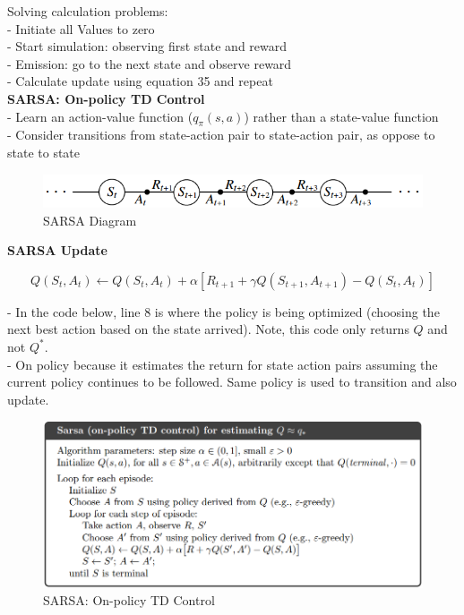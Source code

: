 \documentclass{article}
\begin{document}
\noindent
Solving calculation problems:\\
- Initiate all Values to zero\\
- Start simulation: observing first state and reward\\
- Emission: go to the next state and observe reward\\
- Calculate update using equation 35 and repeat\\

\noindent
\textbf{SARSA: On-policy TD Control}\\
- Learn an action-value function ($q_{\pi}(s, a)$) rather than a state-value function\\
- Consider transitions from state-action pair to state-action pair, as oppose to
state to state\\

\begin{figure}[h]
\includegraphics[scale=0.5]{sarsa_diagram}
\centering
\caption{SARSA Diagram}
\end{figure}

\newpage
\noindent
\textbf{SARSA Update}

\begin{equation}
Q\left(S_{t}, A_{t}\right) \leftarrow Q\left(S_{t}, A_{t}\right)+\alpha\left[R_{t+1}+\gamma Q\left(S_{t+1}, A_{t+1}\right)-Q\left(S_{t}, A_{t}\right)\right]
\end{equation}

\noindent
- In the code below, line 8 is where the policy is being optimized (choosing the
next best action based on the state arrived). Note, this code only returns $Q$
and not $Q^{*}$.\\
- On policy because it estimates the return for state action pairs assuming the
current policy continues to be followed. Same policy is used to transition and
also update.

\begin{figure}[h]
\includegraphics[scale=0.4]{onpolicy_sarsa}
\centering
\caption{SARSA: On-policy TD Control}
\end{figure}
\end{document}
